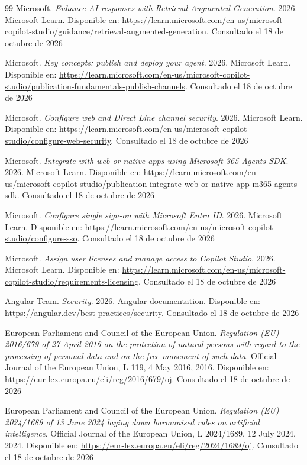 \documentclass[12pt,twoside,titlepage]{book}
\begin{document}
\begin{thebibliography}{99}
 {Microsoft}. \textit{Enhance {AI} responses with Retrieval Augmented Generation}. 2026. Microsoft Learn. Disponible en: \url{https://learn.microsoft.com/en-us/microsoft-copilot-studio/guidance/retrieval-augmented-generation}. Consultado el 18 de octubre de 2026

 {Microsoft}. \textit{Key concepts: publish and deploy your agent}. 2026. Microsoft Learn. Disponible en: \url{https://learn.microsoft.com/en-us/microsoft-copilot-studio/publication-fundamentals-publish-channels}. Consultado el 18 de octubre de 2026

 {Microsoft}. \textit{Configure web and Direct Line channel security}. 2026. Microsoft Learn. Disponible en: \url{https://learn.microsoft.com/en-us/microsoft-copilot-studio/configure-web-security}. Consultado el 18 de octubre de 2026

 {Microsoft}. \textit{Integrate with web or native apps using {Microsoft 365 Agents SDK}}. 2026. Microsoft Learn. Disponible en: \url{https://learn.microsoft.com/en-us/microsoft-copilot-studio/publication-integrate-web-or-native-app-m365-agents-sdk}. Consultado el 18 de octubre de 2026

 {Microsoft}. \textit{Configure single sign-on with {Microsoft Entra ID}}. 2026. Microsoft Learn. Disponible en: \url{https://learn.microsoft.com/en-us/microsoft-copilot-studio/configure-sso}. Consultado el 18 de octubre de 2026

 {Microsoft}. \textit{Assign user licenses and manage access to Copilot Studio}. 2026. Microsoft Learn. Disponible en: \url{https://learn.microsoft.com/en-us/microsoft-copilot-studio/requirements-licensing}. Consultado el 18 de octubre de 2026

 {Angular Team}. \textit{Security}. 2026. Angular documentation. Disponible en: \url{https://angular.dev/best-practices/security}. Consultado el 18 de octubre de 2026

 {European Parliament and Council of the European Union}. \textit{Regulation ({EU}) 2016/679 of 27 April 2016 on the protection of natural persons with regard to the processing of personal data and on the free movement of such data}. Official Journal of the European Union, L 119, 4 May 2016, 2016. Disponible en: \url{https://eur-lex.europa.eu/eli/reg/2016/679/oj}. Consultado el 18 de octubre de 2026

 {European Parliament and Council of the European Union}. \textit{Regulation ({EU}) 2024/1689 of 13 June 2024 laying down harmonised rules on artificial intelligence}. Official Journal of the European Union, L 2024/1689, 12 July 2024, 2024. Disponible en: \url{https://eur-lex.europa.eu/eli/reg/2024/1689/oj}. Consultado el 18 de octubre de 2026

\end{thebibliography}
\end{document}
